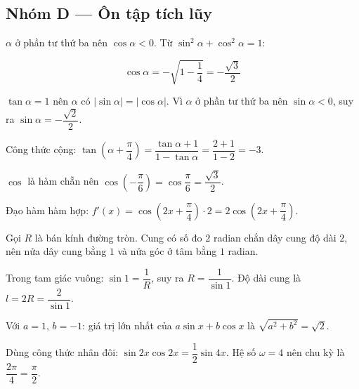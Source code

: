 \documentclass[11pt, a4paper]{article}
\begin{document}
\subsection*{Nhóm D — Ôn tập tích lũy}

\begin{dapan}[1 — Đáp án A]
$\alpha$ ở phần tư thứ ba nên $\cos\alpha < 0$. Từ $\sin^2\alpha + \cos^2\alpha = 1$:

$$\cos\alpha = -\sqrt{1 - \frac{1}{4}} = -\frac{\sqrt{3}}{2}$$
\end{dapan}

\begin{dapan}[2 — Đáp án D]
$\tan\alpha = 1$ nên $\alpha$ có $|\sin\alpha| = |\cos\alpha|$. Vì $\alpha$ ở phần tư thứ ba nên $\sin\alpha < 0$, suy ra $\sin\alpha = -\dfrac{\sqrt{2}}{2}$.
\end{dapan}

\begin{dapan}[3 — Đáp án B]
Công thức cộng: $\tan\left(\alpha + \dfrac{\pi}{4}\right) = \dfrac{\tan\alpha + 1}{1 - \tan\alpha} = \dfrac{2 + 1}{1 - 2} = -3$.
\end{dapan}

\begin{dapan}[4 — Đáp án C]
$\cos$ là hàm chẵn nên $\cos\left(-\dfrac{\pi}{6}\right) = \cos\dfrac{\pi}{6} = \dfrac{\sqrt{3}}{2}$.
\end{dapan}

\begin{dapan}[5 — Đáp án D]
Đạo hàm hàm hợp: $f'(x) = \cos\left(2x + \dfrac{\pi}{4}\right) \cdot 2 = 2\cos\left(2x + \dfrac{\pi}{4}\right)$.
\end{dapan}

\begin{dapan}[6 — Đáp án C]
Gọi $R$ là bán kính đường tròn. Cung có số đo $2$ radian chắn dây cung độ dài $2$, nên nửa dây cung bằng $1$ và nửa góc ở tâm bằng $1$ radian.

Trong tam giác vuông: $\sin 1 = \dfrac{1}{R}$, suy ra $R = \dfrac{1}{\sin 1}$. Độ dài cung là $l = 2R = \dfrac{2}{\sin 1}$.
\end{dapan}

\begin{dapan}[7 — Đáp án A]
Với $a = 1$, $b = -1$: giá trị lớn nhất của $a\sin x + b\cos x$ là $\sqrt{a^2 + b^2} = \sqrt{2}$.
\end{dapan}

\begin{dapan}[8 — Đáp án A]
Dùng công thức nhân đôi: $\sin 2x\cos 2x = \dfrac{1}{2}\sin 4x$. Hệ số $\omega = 4$ nên chu kỳ là $\dfrac{2\pi}{4} = \dfrac{\pi}{2}$.
\end{dapan}
\end{document}

